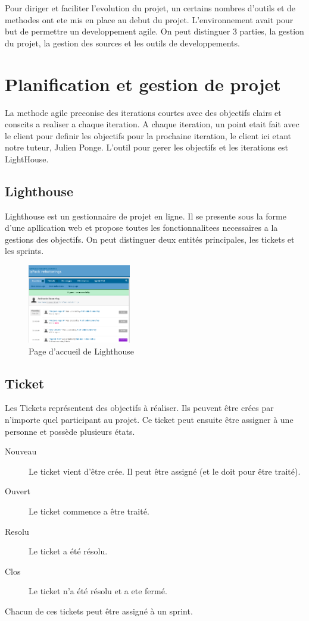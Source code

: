 Pour diriger et faciliter l'evolution du projet, un certains nombres d'outils et de methodes ont ete mis en place au debut du projet. L'environnement avait pour but de permettre un developpement agile. On peut distinguer 3 parties, la gestion du projet, la gestion des sources et les outils de developpements.
\section{Planification et gestion de projet}
La methode agile preconise des iterations courtes avec des objectifs clairs et conscits a realiser a chaque iteration. A chaque iteration, un point etait fait avec le client pour definir les objectifs pour la prochaine iteration, le client ici etant notre tuteur, Julien Ponge. L'outil pour gerer les objectifs et les iterations est LightHouse.
\subsection{Lighthouse}
Lighthouse est un gestionnaire de projet en ligne. Il se presente sous la forme d'une apllication web et propose toutes les fonctionnalitees necessaires a la gestions des objectifs. On peut distinguer deux entités principales, les tickets et les sprints.
\begin{figure}[H]
	\centering
	\includegraphics[width=0.4\textwidth]{../image/lighthouse.png}
	\caption{Page d'accueil de Lighthouse}
\end{figure}
\subsection{Ticket}
Les Tickets représentent des objectifs à réaliser. Ils peuvent être crées par n'importe quel participant au projet. Ce ticket peut ensuite être assigner à une personne et possède plusieurs états.
\begin{description}
\item[Nouveau] Le ticket vient d'être crée. Il peut être assigné (et le doit pour être traité).
\item[Ouvert] Le ticket commence a être traité.
\item[Resolu] Le ticket a été résolu.
\item[Clos] Le ticket n'a été résolu et a ete fermé.
\end{description}
Chacun de ces tickets peut être assigné à un sprint.
